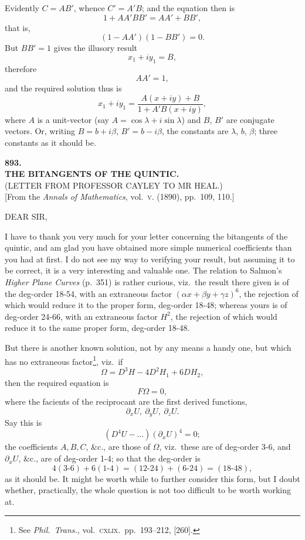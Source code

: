 \documentclass[11pt,a4paper]{article}
\begin{document}
\smallskip
Evidently $C = AB'$, whence $C' = A'B$; and the equation then is
\[
1 + AA'BB' = AA' + BB',
\]
that is,
\[
(1 - AA')(1 - BB') = 0.
\]
But $BB' = 1$ gives the illusory result
\[
x_1 + iy_1 = B,
\]
therefore
\[
AA' = 1,
\]
and the required solution thus is
\[
x_1 + iy_1 = \frac{A(x + iy) + B}{1 + A'B(x + iy)},
\]
where $A$ is a unit-vector (say $A = \cos\lambda + i\sin\lambda$) and $B$, $B'$ are conjugate vectors. Or, writing $B = b + i\beta$, $B' = b - i\beta$, the constants are $\lambda$, $b$, $\beta$; three constants as it should be.

\bigskip

\clearpage
\begin{center}
{\large\bfseries 893.}\\[0.5em]
{\large\bfseries THE BITANGENTS OF THE QUINTIC.}\\[0.3em]
(LETTER FROM PROFESSOR CAYLEY TO MR HEAL.)\\[0.5em]
\small [From the \emph{Annals of Mathematics}, vol.\ \textsc{v}. (1890), pp.\ 109, 110.]
\end{center}
\medskip

DEAR SIR,

\smallskip
\hspace{1em} I have to thank you very much for your letter concerning the bitangents of the quintic, and am glad you have obtained more simple numerical coefficients than you had at first. I do not see my way to verifying your result, but assuming it to be correct, it is a very interesting and valuable one. The relation to Salmon's \emph{Higher Plane Curves} (p.\ 351) is rather curious, viz.\ the result there given is of the deg-order 18-54, with an extraneous factor $(\alpha x + \beta y + \gamma z)^6$, the rejection of which would reduce it to the proper form, deg-order 18-48; whereas yours is of deg-order 24-66, with an extraneous factor $H^2$, the rejection of which would reduce it to the same proper form, deg-order 18-48.

\smallskip
But there is another known solution, not by any means a handy one, but which has no extraneous factor\footnote{See \emph{Phil.\ Trans.}, vol.\ \textsc{cxlix}.\ pp.\ 193--212, [260].}, viz.\ if
\[
\Omega = D^3 H - 4 D^2 H_1 + 6 D H_2,
\]
then the required equation is
\[
F\Omega = 0,
\]
where the facients of the reciprocant are the first derived functions,
\[
\partial_x U,\ \partial_y U,\ \partial_z U.
\]
Say this is
\[
(D^4 U - \ldots)(\partial_x U)^4 = 0;
\]
the coefficients $A, B, C$, \&c., are those of $\Omega$, viz.\ these are of deg-order 3-6, and $\partial_x U$, \&c., are of deg-order 1-4; so that the deg-order is
\[
4(3\text{-}6) + 6(1\text{-}4) = (12\text{-}24) + (6\text{-}24) = (18\text{-}48),
\]
as it should be. It might be worth while to further consider this form, but I doubt whether, practically, the whole question is not too difficult to be worth working at.
\end{document}

